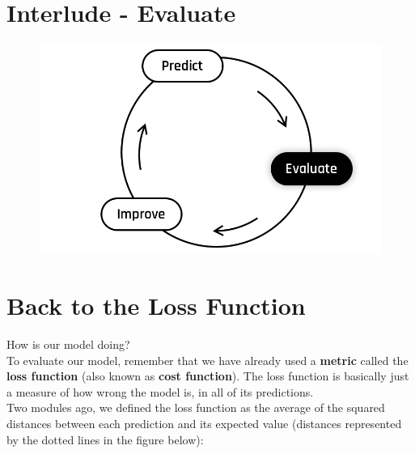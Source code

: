 
\section*{Interlude - Evaluate}

\begin{figure}[!h]
    \centering
    \includegraphics[scale=0.2]{assets/Evaluate.png}
\end{figure}

\section*{Back to the Loss Function}
How is our model doing?\\
To evaluate our model, remember that we have already used a \textbf{metric} called the \textbf{loss function} (also known as \textbf{cost function}).
The loss function is basically just a measure of how wrong the model is, in all of its predictions.\\
\newline
Two modules ago, we defined the loss function as the average of the squared distances between each prediction and its expected value (distances represented by the dotted lines in the figure below):

